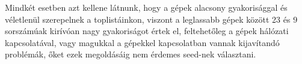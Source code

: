 Mindkét esetben azt kellene látnunk, hogy a gépek alacsony gyakorisággal és véletlenül szerepelnek a toplistáinkon, viszont a leglassabb gépek között 23 és 9 sorszámúak kirívóan nagy gyakoriságot értek el, feltehetőleg a gépek hálózati kapcsolatával, vagy magukkal a gépekkel kapcsolatban vannak kijavítandó problémák, őket ezek megoldásáig nem érdemes seed-nek választani.

%
%

